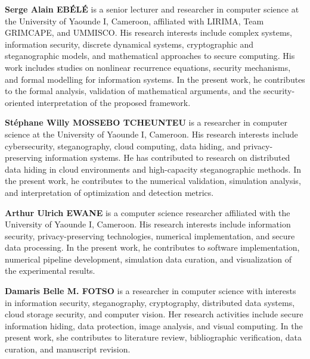 \documentclass[a4paper,fleqn]{cas-dc}
\begin{document}
\vspace{0.5em}

\noindent\textbf{Serge Alain EB\'EL\'E}
is a senior lecturer and researcher in computer science at the University of Yaounde I, Cameroon,
affiliated with LIRIMA, Team GRIMCAPE, and UMMISCO. His research interests
include complex systems, information security, discrete dynamical systems,
cryptographic and steganographic models, and mathematical approaches to secure
computing. His work includes studies on nonlinear recurrence equations,
security mechanisms, and formal modelling for information systems. In the
present work, he contributes to the formal analysis, validation of mathematical
arguments, and the security-oriented interpretation of the proposed framework.
\endbio

\vspace{3.5em}

\noindent\textbf{St\'ephane Willy MOSSEBO TCHEUNTEU}
is a researcher in computer science at the University of Yaounde I, Cameroon.
His research interests include cybersecurity, steganography, cloud computing,
data hiding, and privacy-preserving information systems. He has contributed to
research on distributed data hiding in cloud environments and high-capacity
steganographic methods. In the present work, he contributes to the numerical
validation, simulation analysis, and interpretation of optimization and
detection metrics.
\endbio

\vspace{0.5em}
\newpage
{}
\noindent\textbf{Arthur Ulrich EWANE}
is a computer science researcher affiliated with the University of Yaounde I,
Cameroon. His research interests include information security,
privacy-preserving technologies, numerical implementation, and secure data
processing. In the present work, he contributes to software implementation,
numerical pipeline development, simulation data curation, and visualization of
the experimental results.
\endbio

\vspace{0.5em}

\noindent\textbf{Damaris Belle M. FOTSO}
is a researcher in computer science with interests in information security,
steganography, cryptography, distributed data systems, cloud storage security,
and computer vision. Her research activities include secure information hiding,
data protection, image analysis, and visual computing. In the present work, she
contributes to literature review, bibliographic verification, data curation,
and manuscript revision.
\endbio
\end{document}
